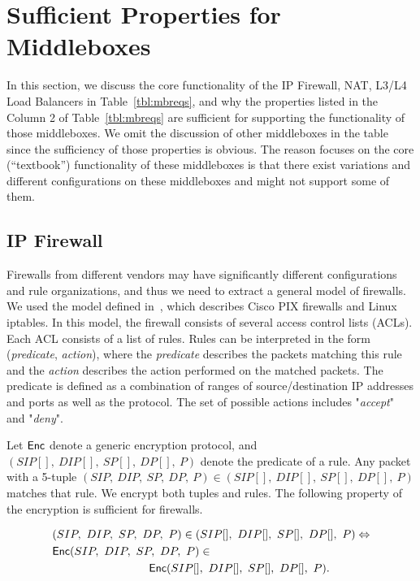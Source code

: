 \newpage
\appendix
\section{Sufficient Properties for Middleboxes} 
\label{sec:appendix:middleboxes}
In this section, we discuss the core functionality of the IP Firewall, NAT, L3/L4 Load Balancers 
in Table~\ref{tbl:mbreqs}, and why the properties listed in the Column 2 of Table~\ref{tbl:mbreqs} are
sufficient for supporting the functionality of those middleboxes. We omit the discussion of other middleboxes
 in the table since the sufficiency of those properties is obvious. 
The reason \sys focuses on the core (``textbook'') functionality of these middleboxes is that there exist variations and different configurations on these middleboxes  and \sys might not support some of them. 

\subsection{IP Firewall}
Firewalls from different vendors may have significantly different configurations and rule organizations, 
and thus we need to extract a general model of firewalls. We used the model defined in~\cite{fireman}, 
which describes Cisco
PIX firewalls and Linux iptables. In this model, the firewall consists of several access control lists (ACLs). 
Each ACL consists of a list of rules. Rules can be interpreted in the form (\emph{predicate}, \emph{action}), 
where the \emph{predicate} describes the packets matching this rule and the \emph{action} describes
the action performed on the matched packets. The predicate is defined as a combination of ranges of source/destination
IP addresses and ports as well as the protocol. The set of possible actions includes "\emph{accept}" and "\emph{deny}".

 Let $\mathsf{Enc}$ denote a generic encryption protocol, and 
$(SIP[],\ DIP[],\ SP[],\ DP[],\ P)$ denote the predicate of a rule. Any packet with a 5-tuple 
$(SIP,\ DIP,\ SP,\ DP,\ P) \in (SIP[],\ DIP[],\ SP[],\ DP[],\ P)$ matches that rule. 
We encrypt both tuples and rules. The following property of the encryption is sufficient for firewalls.

\begin{equation}
\label{eqn:firewall}
\begin{split}
& (SIP,\ DIP,\ SP,\ DP,\ P) \in (SIP[],\ DIP[],\ SP[],\ DP[],\ P) \Leftrightarrow \\
& \Enc(SIP,\ DIP,\ SP,\ DP,\ P) \in \\
& \hspace{3cm} \Enc(SIP[],\ DIP[],\ SP[],\ DP[],\ P).
\end{split}
\end{equation}

